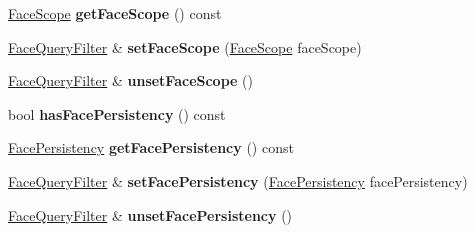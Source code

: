 \begin{DoxyCompactItemize}
\item 
\hyperlink{group__management_gaa49e0fd703a14e5bf904d15428fd6059}{Face\+Scope} {\bfseries get\+Face\+Scope} () const\hypertarget{classndn_1_1nfd_1_1FaceQueryFilter_ad04373f92921910761daac488cf91773}{}\label{classndn_1_1nfd_1_1FaceQueryFilter_ad04373f92921910761daac488cf91773}

\item 
\hyperlink{classndn_1_1nfd_1_1FaceQueryFilter}{Face\+Query\+Filter} \& {\bfseries set\+Face\+Scope} (\hyperlink{group__management_gaa49e0fd703a14e5bf904d15428fd6059}{Face\+Scope} face\+Scope)\hypertarget{classndn_1_1nfd_1_1FaceQueryFilter_a97bf96e9de2a7e8e5cd78d57b64b75e9}{}\label{classndn_1_1nfd_1_1FaceQueryFilter_a97bf96e9de2a7e8e5cd78d57b64b75e9}

\item 
\hyperlink{classndn_1_1nfd_1_1FaceQueryFilter}{Face\+Query\+Filter} \& {\bfseries unset\+Face\+Scope} ()\hypertarget{classndn_1_1nfd_1_1FaceQueryFilter_a2ffc5d31d9905f5854d7f7afca6217db}{}\label{classndn_1_1nfd_1_1FaceQueryFilter_a2ffc5d31d9905f5854d7f7afca6217db}

\item 
bool {\bfseries has\+Face\+Persistency} () const\hypertarget{classndn_1_1nfd_1_1FaceQueryFilter_a310ef6e85eed1dc85e77592267e8ac36}{}\label{classndn_1_1nfd_1_1FaceQueryFilter_a310ef6e85eed1dc85e77592267e8ac36}

\item 
\hyperlink{group__management_ga05df4b7c484a0fae25d3e65962511bac}{Face\+Persistency} {\bfseries get\+Face\+Persistency} () const\hypertarget{classndn_1_1nfd_1_1FaceQueryFilter_aa2a3438586e05ea74e3eca539ba37693}{}\label{classndn_1_1nfd_1_1FaceQueryFilter_aa2a3438586e05ea74e3eca539ba37693}

\item 
\hyperlink{classndn_1_1nfd_1_1FaceQueryFilter}{Face\+Query\+Filter} \& {\bfseries set\+Face\+Persistency} (\hyperlink{group__management_ga05df4b7c484a0fae25d3e65962511bac}{Face\+Persistency} face\+Persistency)\hypertarget{classndn_1_1nfd_1_1FaceQueryFilter_ab676e52327e83965f2ff7d1320922db1}{}\label{classndn_1_1nfd_1_1FaceQueryFilter_ab676e52327e83965f2ff7d1320922db1}

\item 
\hyperlink{classndn_1_1nfd_1_1FaceQueryFilter}{Face\+Query\+Filter} \& {\bfseries unset\+Face\+Persistency} ()\hypertarget{classndn_1_1nfd_1_1FaceQueryFilter_a822696fda4648ab1dd9407de6b27b8b1}{}\label{classndn_1_1nfd_1_1FaceQueryFilter_a822696fda4648ab1dd9407de6b27b8b1}


\end{DoxyCompactItemize}
